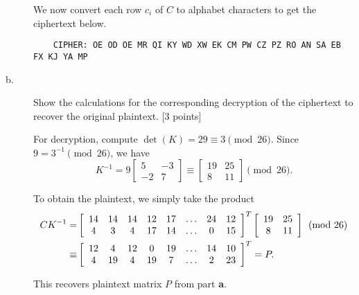 \documentclass[../hw_sols.tex]{subfiles}
\begin{document}
\begin{description}
\begin{solution}
We now convert each row $c_i$ of $C$ to alphabet characters to get the ciphertext below.
	\begin{verbatim}
    CIPHER: OE OD OE MR QI KY WD XW EK CM PW CZ PZ RO AN SA EB FX KJ YA MP
	\end{verbatim}

\end{solution}


\item[b.] Show the calculations for the corresponding decryption of the ciphertext to recover the original plaintext. [3 points]

\begin{solution}
For decryption, compute $\det(K) = 29 \equiv 3 \pmod{26}$. Since $9 = 3^{-1} \pmod{26}$, we have
	$$K^{-1} = 9
	\begin{bmatrix}
		5 & -3 \\ -2 & 7
	\end{bmatrix} 
	\equiv
	\begin{bmatrix}
		19 & 25 \\ 8 & 11
	\end{bmatrix} 
	\pmod{26}.$$
	
To obtain the plaintext, we simply take the product	
\begin{align*}
	CK^{-1} =& 
	\left[ \begin{array}{ *{8}{c} }
		14 & 14 & 14 & 12 & 17 & \dots & 24 & 12 \\
		4 & 3 & 4 & 17 & 14 & \dots & 0 & 15
	\end{array} \right]^T
	\left[ \begin{array}{ c c }
		19 & 25 \\ 8 & 11
	\end{array}\right] 
		\pmod{26} \\
	\equiv& 
	\left[ \begin{array}{ *{8}{c} }
		12 & 4 & 12 & 0 & 19 & \dots & 14 & 10 \\
		4 & 19 & 4 & 19 & 7 & \dots & 2 & 23
	\end{array}\right]^T 
		= P.
\end{align*}

This recovers plaintext matrix $P$ from part \textbf{a}.

\end{solution}

\end{description}


\newpage


\end{document}
